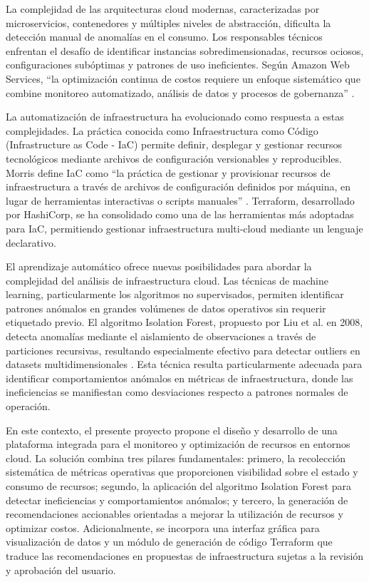 La complejidad de las arquitecturas cloud modernas, caracterizadas por microservicios, contenedores y múltiples niveles de abstracción, dificulta la detección manual de anomalías en el consumo. Los responsables técnicos enfrentan el desafío de identificar instancias sobredimensionadas, recursos ociosos, configuraciones subóptimas y patrones de uso ineficientes. Según Amazon Web Services, ``la optimización continua de costos requiere un enfoque sistemático que combine monitoreo automatizado, análisis de datos y procesos de gobernanza'' \parencite{AWS2023}.

La automatización de infraestructura ha evolucionado como respuesta a estas complejidades. La práctica conocida como Infraestructura como Código (Infrastructure as Code - IaC) permite definir, desplegar y gestionar recursos tecnológicos mediante archivos de configuración versionables y reproducibles. Morris define IaC como ``la práctica de gestionar y provisionar recursos de infraestructura a través de archivos de configuración definidos por máquina, en lugar de herramientas interactivas o scripts manuales'' \parencite{Morris2016}. Terraform, desarrollado por HashiCorp, se ha consolidado como una de las herramientas más adoptadas para IaC, permitiendo gestionar infraestructura multi-cloud mediante un lenguaje declarativo.

El aprendizaje automático ofrece nuevas posibilidades para abordar la complejidad del análisis de infraestructura cloud. Las técnicas de machine learning, particularmente los algoritmos no supervisados, permiten identificar patrones anómalos en grandes volúmenes de datos operativos sin requerir etiquetado previo. El algoritmo Isolation Forest, propuesto por Liu et al. en 2008, detecta anomalías mediante el aislamiento de observaciones a través de particiones recursivas, resultando especialmente efectivo para detectar outliers en datasets multidimensionales \parencite{Liu2008}. Esta técnica resulta particularmente adecuada para identificar comportamientos anómalos en métricas de infraestructura, donde las ineficiencias se manifiestan como desviaciones respecto a patrones normales de operación.

En este contexto, el presente proyecto propone el diseño y desarrollo de una plataforma integrada para el monitoreo y optimización de recursos en entornos cloud. La solución combina tres pilares fundamentales: primero, la recolección sistemática de métricas operativas que proporcionen visibilidad sobre el estado y consumo de recursos; segundo, la aplicación del algoritmo Isolation Forest para detectar ineficiencias y comportamientos anómalos; y tercero, la generación de recomendaciones accionables orientadas a mejorar la utilización de recursos y optimizar costos. Adicionalmente, se incorpora una interfaz gráfica para visualización de datos y un módulo de generación de código Terraform que traduce las recomendaciones en propuestas de infraestructura sujetas a la revisión y aprobación del usuario.

